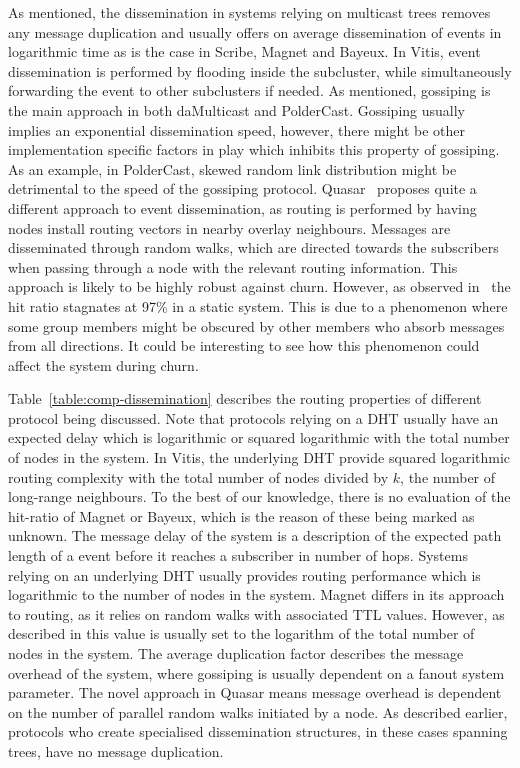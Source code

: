 As mentioned, the dissemination in systems relying on multicast trees
removes any message duplication and usually offers on average
dissemination of events in logarithmic time as is the case in Scribe,
Magnet and Bayeux. In Vitis, event dissemination is performed by
flooding inside the subcluster, while simultaneously forwarding the
event to other subclusters if needed. As mentioned, gossiping is the
main approach in both daMulticast and PolderCast.  Gossiping usually
implies an exponential dissemination speed, however, there might be
other implementation specific factors in play which inhibits this
property of gossiping. As an example, in PolderCast, skewed random link
distribution might be detrimental to the speed of the gossiping
protocol. Quasar~\cite{Wong:2008} proposes quite a different approach
to event dissemination, as routing is performed by having nodes install
routing vectors in nearby overlay neighbours. Messages are disseminated
through random walks, which are directed towards the subscribers when
passing through a node with the relevant routing information. This
approach is likely to be highly robust against churn. However, as
observed in~\cite{Wong:2008} the hit ratio stagnates at 97\% in a
static system. This is due to a phenomenon where some group members
might be obscured by other members who absorb messages
from all directions. It could be interesting to see how this phenomenon
could affect the system during churn.



Table~\ref{table:comp-dissemination} describes the routing properties of
different protocol being discussed. Note that protocols relying on a DHT
usually have an expected delay which is logarithmic or squared
logarithmic with the total number of nodes in the system. In Vitis, the
underlying DHT provide squared logarithmic routing complexity with the
total number of nodes divided by $k$, the number of long-range
neighbours. To the best of our knowledge, there is no evaluation of the
hit-ratio of Magnet or Bayeux, which is the reason of these being marked
as unknown. The message delay of the system is a description of the
expected path length of a event before it reaches a subscriber in number
of hops. Systems relying on an underlying DHT usually provides routing
performance which is logarithmic to the number of nodes in the system.
Magnet differs in its approach to routing, as it relies on random walks
with associated TTL values. However, as described in
\cite{Girdzijauskas:2010} this value is usually set to the logarithm of the
total number of nodes in the system. The average duplication factor
describes the message overhead of the system, where gossiping is usually
dependent on a fanout system parameter. The novel approach in Quasar
means message overhead is dependent on the number of parallel random
walks initiated by a node. As described earlier, protocols who create
specialised dissemination structures, in these cases spanning trees,
have no message duplication.
